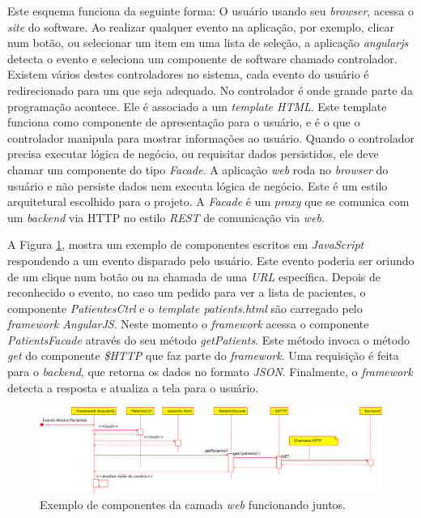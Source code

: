Este esquema funciona da seguinte forma: O usuário usando seu \emph{browser}, acessa o \emph{site} do software. 
Ao realizar qualquer evento na aplicação, por exemplo, clicar num botão, ou selecionar um item em uma lista de seleção, a aplicação \emph{angularjs} detecta o evento e seleciona um componente de software chamado controlador. 
Existem vários destes controladores no sistema, cada evento do usuário é redirecionado para um que seja adequado.
No controlador é onde grande parte da programação acontece. 
Ele é associado a um \emph{template HTML}. 
Este template funciona como componente de apresentação para o usuário, e é o que o controlador manipula para mostrar informações ao usuário.
Quando o controlador precisa executar lógica de negócio, ou requisitar dados persistidos, ele deve chamar um componente do tipo \emph{Facade}. 
A aplicação \emph{web} roda no \emph{browser} do usuário e não persiste dados nem executa lógica de negócio. 
Este é um estilo arquitetural escolhido para o projeto.
A \emph{Facade} é um \emph{proxy} que se comunica com um \emph{backend} via HTTP no estilo \emph{REST} de comunicação via \emph{web}.

A Figura \ref{web_components}, mostra um exemplo de componentes escritos em \emph{JavaScript} respondendo a um evento disparado pelo usuário. 
Este evento poderia ser oriundo de um clique num botão ou na chamada de uma \emph{URL} específica. 
Depois de reconhecido o evento, no caso um pedido para ver a lista de pacientes, o componente \emph{PatientesCtrl} e o \emph{template patients.html} são carregado pelo \emph{framework AngularJS}. 
Neste momento o \emph{framework} acessa o componente \emph{PatientsFacade} através do seu método \emph{getPatients}. 
Este método invoca o método \emph{get} do componente \emph{\$HTTP} que faz parte do \emph{framework}.
Uma requisição é feita para o \emph{backend}, que retorna os dados no formato \emph{JSON}.
Finalmente, o \emph{framework} detecta a resposta e atualiza a tela para o usuário.

\begin{figure}[H]
	\centering
	\includegraphics[width=17cm]{figuras/web_componentes.eps}
	\caption{Exemplo de componentes da camada \emph{web} funcionando juntos.}
	\label{web_components}
\end{figure}


